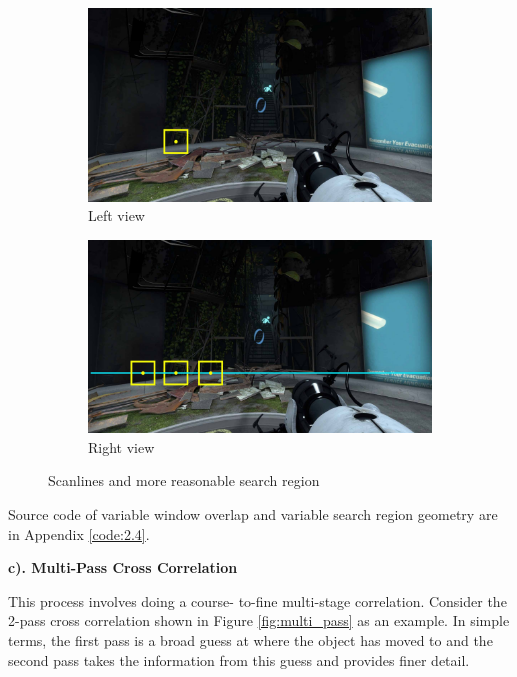 \begin{figure}[h!]
	\centering
	\begin{subfigure}[t]{0.48\linewidth}
		\centering
		\includegraphics[width=1\linewidth]{figures/part2/search_region1a}
		\caption{Left view}
	\end{subfigure}
	\begin{subfigure}[t]{0.48\linewidth}
		\centering
		\includegraphics[width=1\linewidth]{figures/part2/search_region1b}
		\caption{Right view}
		\label{fig:search_region1b}
	\end{subfigure}
	\caption{Scanlines and more reasonable search region}
	\label{fig:search_region1}
\end{figure}

Source code of variable window overlap and variable search region geometry are in Appendix \ref{code:2.4}.

\textbf{c). Multi-Pass Cross Correlation}

This process involves doing a course- to-fine multi-stage correlation. Consider the 2-pass cross correlation shown in Figure \ref{fig:multi_pass} as an example. In simple terms, the first pass is a broad guess at where the object has moved to and the second pass takes the information from this guess and provides finer detail.

